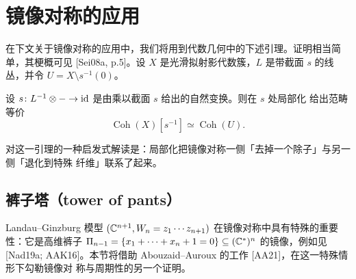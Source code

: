 \section{镜像对称的应用}

在下文关于镜像对称的应用中，我们将用到代数几何中的下述引理。证明相当简单，其梗概可见
[Sei08a, p.5]。设 $X$ 是光滑拟射影代数簇，$L$ 是带截面 $s$ 的线丛，并令
$U=X\setminus s^{-1}(0)$。

\begin{lemma}\label{lem:5-0-1}
设 $s\colon L^{-1}\otimes-\to\mathrm{id}$ 是由乘以截面 $s$ 给出的自然变换。则在 $s$ 处局部化
给出范畴等价
\[
\operatorname{Coh}(X)[s^{-1}]\simeq\operatorname{Coh}(U).
\]
\end{lemma}


对这一引理的一种启发式解读是：局部化把镜像对称一侧「去掉一个除子」与另一侧「退化到特殊
纤维」联系了起来。


\subsection{裤子塔（tower of pants）}

Landau--Ginzburg 模型 $(\mathbb{C}^{n+1},W_n=z_1\cdots z_{n+1})$ 在镜像对称中具有特殊的重要
性：它是高维裤子 $\Pi_{n-1}=\{x_1+\cdots+x_n+1=0\}\subseteq(\mathbb{C}^*)^n$ 的镜像，例如见
[Nad19a; AAK16]。本节将借助 Abouzaid--Auroux 的工作 [AA21]，在这一特殊情形下勾勒镜像对
称与周期性的另一个证明。


